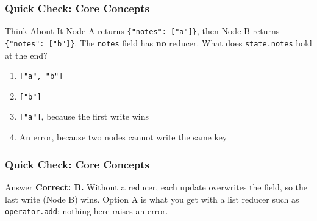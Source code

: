 \begin{frame}[fragile]\frametitle{Quick Check: Core Concepts}
\begin{block}{Think About It}
Node A returns \texttt{\{"notes": ["a"]\}}, then Node B returns \texttt{\{"notes": ["b"]\}}. The \texttt{notes} field has \textbf{no} reducer. What does \texttt{state.notes} hold at the end?
\begin{enumerate}
  \item[A.] \texttt{["a", "b"]}
  \item[B.] \texttt{["b"]}
  \item[C.] \texttt{["a"]}, because the first write wins
  \item[D.] An error, because two nodes cannot write the same key
\end{enumerate}
\end{block}
\end{frame}
\begin{frame}[fragile]\frametitle{Quick Check: Core Concepts}
\begin{block}{Answer}
\textbf{Correct: B.} Without a reducer, each update overwrites the field, so the last write (Node B) wins. Option A is what you get with a list reducer such as \texttt{operator.add}; nothing here raises an error.
\end{block}
\end{frame}
